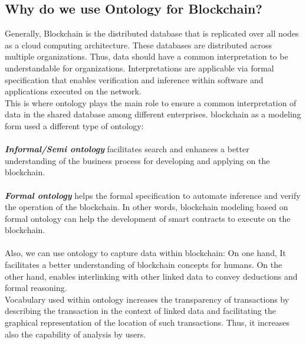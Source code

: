 \subsection{Why do we use Ontology for Blockchain?}
Generally, Blockchain is the distributed database that is replicated over all nodes as a cloud computing architecture. These databases are distributed across multiple organizations. Thus, data should have a common interpretation to be understandable for organizations. Interpretations are applicable via formal specification that enables verification and inference within software and applications executed on the network. \\
This is where ontology plays the main role to ensure a common interpretation of data in the shared database among different enterprises.
blockchain as a modeling form used a different type of ontology: \\
\\
\textbf{\textit{Informal/Semi ontology}} facilitates search and enhances a better understanding of the business process for developing and applying on the blockchain.\\
\\
\textbf{\textit{Formal ontology}} helps the formal specification to automate inference and verify the operation of the blockchain. In other words, blockchain modeling based on formal ontology can help the development of smart contracts to execute on the blockchain.\\
\\
Also, we can use ontology to capture data within blockchain: On one hand, It facilitates a better understanding of blockchain concepts for humans. On the other hand, enables interlinking with other linked data to convey deductions and formal reasoning\cite{Kim}.\\
Vocabulary used within ontology increases the transparency of transactions by describing the transaction in the context of linked data and facilitating the graphical representation of the location of such transactions. Thus, it increases also the capability of analysis by users\cite{Kim}.

